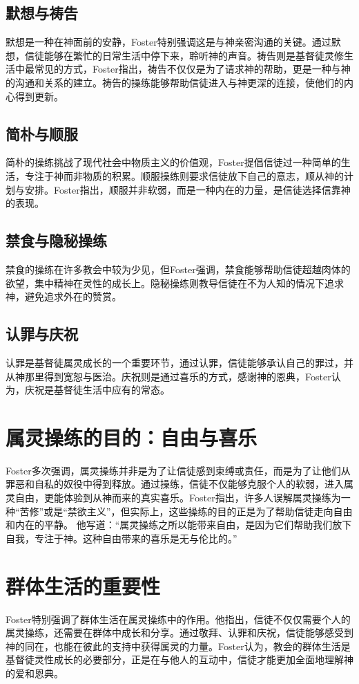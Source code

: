\documentclass[12pt, a4paper]{ctexart}
\begin{document}
\subsection{默想与祷告}
默想是一种在神面前的安静，Foster特别强调这是与神亲密沟通的关键。通过默想，信徒能够在繁忙的日常生活中停下来，聆听神的声音。祷告则是基督徒灵修生活中最常见的方式，Foster指出，祷告不仅仅是为了请求神的帮助，更是一种与神的沟通和关系的建立。祷告的操练能够帮助信徒进入与神更深的连接，使他们的内心得到更新。
\subsection{简朴与顺服}
简朴的操练挑战了现代社会中物质主义的价值观，Foster提倡信徒过一种简单的生活，专注于神而非物质的积累。顺服操练则要求信徒放下自己的意志，顺从神的计划与安排。Foster指出，顺服并非软弱，而是一种内在的力量，是信徒选择信靠神的表现。
\subsection{禁食与隐秘操练}
禁食的操练在许多教会中较为少见，但Foster强调，禁食能够帮助信徒超越肉体的欲望，集中精神在灵性的成长上。隐秘操练则教导信徒在不为人知的情况下追求神，避免追求外在的赞赏。
\subsection{认罪与庆祝}
认罪是基督徒属灵成长的一个重要环节，通过认罪，信徒能够承认自己的罪过，并从神那里得到宽恕与医治。庆祝则是通过喜乐的方式，感谢神的恩典，Foster认为，庆祝是基督徒生活中应有的常态。
\section{属灵操练的目的：自由与喜乐}
Foster多次强调，属灵操练并非是为了让信徒感到束缚或责任，而是为了让他们从罪恶和自私的奴役中得到释放。通过操练，信徒不仅能够克服个人的软弱，进入属灵自由，更能体验到从神而来的真实喜乐。Foster指出，许多人误解属灵操练为一种“苦修”或是“禁欲主义”，但实际上，这些操练的目的正是为了帮助信徒走向自由和内在的平静。
他写道：“属灵操练之所以能带来自由，是因为它们帮助我们放下自我，专注于神。这种自由带来的喜乐是无与伦比的。” 
\section{群体生活的重要性}
Foster特别强调了群体生活在属灵操练中的作用。他指出，信徒不仅仅需要个人的属灵操练，还需要在群体中成长和分享。通过敬拜、认罪和庆祝，信徒能够感受到神的同在，也能在彼此的支持中获得属灵的力量。Foster认为，教会的群体生活是基督徒灵性成长的必要部分，正是在与他人的互动中，信徒才能更加全面地理解神的爱和恩典。
\end{document}
